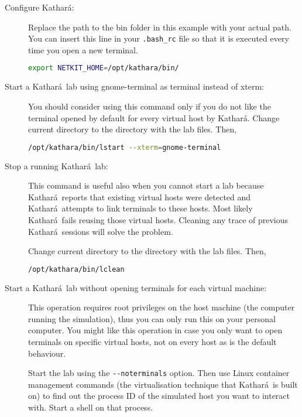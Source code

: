 \documentclass[12pt]{book}
\newcommand{\kathara}{Kathar\'a}
\begin{document}
\begin{description}
\item[Configure \kathara:]
Replace the path to the bin folder in this example with your actual
path. You can insert this line in your \verb$.bash_rc$ file so that it
is executed every time you open a new terminal.
\begin{lstlisting}[language=bash]
  export NETKIT_HOME=/opt/kathara/bin/
\end{lstlisting}

\item[Start a \kathara\ lab using gnome-terminal as terminal instead
  of xterm:] You should consider using this command only if you do not
  like the terminal opened by default for every virtual host by
  \kathara. 
  Change current directory to the directory with the lab files. Then,
\begin{lstlisting}[language=bash]
  /opt/kathara/bin/lstart --xterm=gnome-terminal
\end{lstlisting}

\item[Stop a running \kathara\ lab:] This command is useful also when
  you cannot start a lab because \kathara\ reports that existing
  virtual hosts were detected and \kathara\ attempts to link terminals
  to these hosts. Most likely \kathara\ fails reusing those virtual
  hosts. Cleaning any trace of previous \kathara\ sessions will solve
  the problem.

  Change current directory to the
  directory with the lab files. Then, 
\begin{lstlisting}[language=bash]
  /opt/kathara/bin/lclean
\end{lstlisting}

\item[Start a \kathara\ lab without opening terminals for each virtual
  machine:] This operation requires root privileges on the host
  machine (the computer running the simulation), thus you can only run
  this on your personal computer. You might like this operation in
  case you only want to open terminals on specific virtual hosts, not
  on every host as is the default behaviour. 

  Start the lab using the \verb$--noterminals$ option. Then
  use Linux container management commands (the virtualisation
  technique that \kathara\ is built on) to find out the process ID of
  the simulated host you want to interact with. Start a shell on that
  process.


\end{description}
\end{document}
